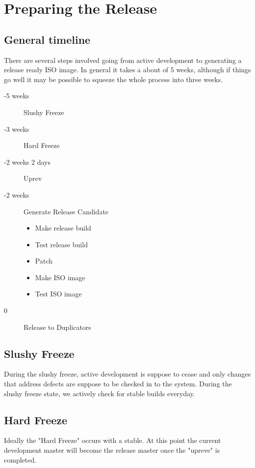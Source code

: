 \chapter{Preparing the Release}
\section{General timeline}
There are several steps involved going from active development to generating a release ready ISO
image.  In general it takes a about of 5 weeks, although if things go well it may be possible to 
squeeze the whole process into three weeks.
\begin{description}
\item[-5 weeks] Slushy Freeze
\item[-3 weeks] Hard Freeze
\item[-2 weeks 2 days] Uprev
\item[-2 weeks] Generate Release Candidate
\begin{itemize}
\item Make release build
\item Test release build
\item Patch
\item Make ISO image
\item Test ISO image
\end{itemize}
\item[0 ] Release to Duplicators
\end{description}
\section{Slushy Freeze}
During the slushy freeze, active development is suppose to cease and only changes that address
defects are suppose to be checked in to the system. During the slushy freeze state, we actively
check for stable builds everyday.
\section{Hard Freeze}
Ideally the "Hard Freeze" occurs with a stable.  At this point the current development master 
will become the release master once the "upreve" is completed.
